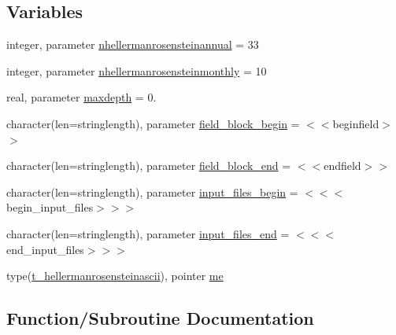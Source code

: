 \subsection*{Variables}
\begin{DoxyCompactItemize}
\item 
integer, parameter \mbox{\hyperlink{namespacemodulehellermanrosensteinascii_a7c99a3c54379548ef0084208ccd395ed}{nhellermanrosensteinannual}} = 33
\item 
integer, parameter \mbox{\hyperlink{namespacemodulehellermanrosensteinascii_adc90d7846e6bfeced43dc1391d5e90aa}{nhellermanrosensteinmonthly}} = 10
\item 
real, parameter \mbox{\hyperlink{namespacemodulehellermanrosensteinascii_a7ea7fe95271e22acb6cd18f683d4534d}{maxdepth}} = 0.
\item 
character(len=stringlength), parameter \mbox{\hyperlink{namespacemodulehellermanrosensteinascii_a9d8b6c5990fab9e4ad7cbaf10b3f7c09}{field\+\_\+block\+\_\+begin}} = \textquotesingle{}$<$$<$beginfield$>$$>$\textquotesingle{}
\item 
character(len=stringlength), parameter \mbox{\hyperlink{namespacemodulehellermanrosensteinascii_ae2ddb5d68a2e480ae833622c57c64662}{field\+\_\+block\+\_\+end}} = \textquotesingle{}$<$$<$endfield$>$$>$\textquotesingle{}
\item 
character(len=stringlength), parameter \mbox{\hyperlink{namespacemodulehellermanrosensteinascii_a84784306a25f21f72365989672906eb5}{input\+\_\+files\+\_\+begin}} = \textquotesingle{}$<$$<$$<$begin\+\_\+input\+\_\+files$>$$>$$>$\textquotesingle{}
\item 
character(len=stringlength), parameter \mbox{\hyperlink{namespacemodulehellermanrosensteinascii_a604227d6abb2c39231e3fb75fd63921f}{input\+\_\+files\+\_\+end}} = \textquotesingle{}$<$$<$$<$end\+\_\+input\+\_\+files$>$$>$$>$\textquotesingle{}
\item 
type(\mbox{\hyperlink{structmodulehellermanrosensteinascii_1_1t__hellermanrosensteinascii}{t\+\_\+hellermanrosensteinascii}}), pointer \mbox{\hyperlink{namespacemodulehellermanrosensteinascii_af64aed3a69e42f0736c203774d0783c9}{me}}
\end{DoxyCompactItemize}


\subsection{Function/\+Subroutine Documentation}
\mbox{\label{namespacemodulehellermanrosensteinascii_a39c581f7647526ad3d09ea87b66e024a}} 
